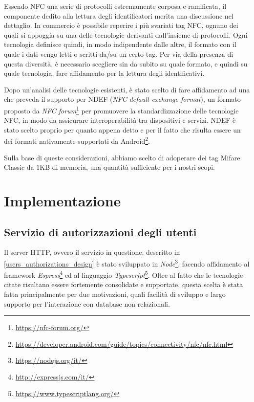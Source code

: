 \documentclass[a4paper,12pt]{report}
\begin{document}
Essendo NFC una serie di protocolli estremamente corposa e ramificata, il componente dedito alla lettura degli identificatori merita una discussione nel dettaglio. In commercio è possibile reperire i più svariati tag NFC, ognuno dei quali si appoggia su una delle tecnologie derivanti dall'insieme di protocolli. Ogni tecnologia definisce quindi, in modo indipendente dalle altre, il formato con il quale i dati vengo letti o scritti da/su un certo tag. Per via della presenza di questa diversità, è necessario scegliere sin da subito su quale formato, e quindi su quale tecnologia, fare affidamento per la lettura degli identificativi.

Dopo un'analisi delle tecnologie esistenti, è stato scelto di fare affidamento ad una che preveda il supporto per NDEF (\emph{NFC default exchange format}), un formato proposto da \emph{NFC forum}\footnote{\url{https://nfc-forum.org/}} per promuovere la standardizzazione delle tecnologie NFC, in modo da assicurare interoperabilità tra dispositivi e servizi. NDEF è stato scelto proprio per quanto appena detto e per il fatto che risulta essere un dei formati nativamente supportati da Android\footnote{\url{https://developer.android.com/guide/topics/connectivity/nfc/nfc.html}}.

Sulla base di queste considerazioni, abbiamo scelto di adoperare dei tag Mifare Classic da 1KB di memoria, una quantità sufficiente per i nostri scopi.


\chapter{Implementazione}

\section{Servizio di autorizzazioni degli utenti}

Il server HTTP, ovvero il servizio in questione, descritto in \autoref{users_authorizations_design} è stato sviluppato in \emph{Node}\footnote{\url{https://nodejs.org/it/}}, facendo affidamento al framework \emph{Espress}\footnote{\url{http://expressjs.com/it/}} ed al linguaggio \emph{Typescript}\footnote{\url{https://www.typescriptlang.org/}}. Oltre al fatto che le tecnologie citate risultano essere fortemente consolidate e supportate, questa scelta è stata fatta principalmente per due motivazioni, quali facilità di sviluppo e largo supporto per l'interazione con database non relazionali.
\end{document}

